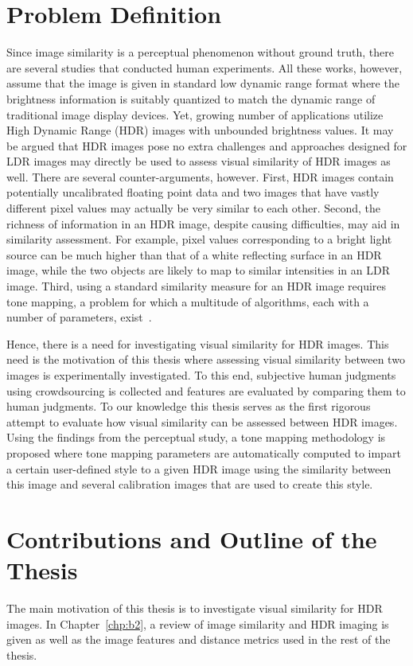 \section{ Problem Definition}
Since image similarity is a perceptual phenomenon without ground truth, there are several studies that conducted human experiments. All these works, however, assume that the image is given in standard low dynamic range format where the brightness information is suitably quantized to match the dynamic range of traditional image display devices. Yet, growing number of applications utilize High Dynamic Range (HDR) images with unbounded brightness values. It may be argued that HDR images pose no extra challenges and approaches designed for LDR images may directly be used to assess visual similarity of HDR images as well. There are several counter-arguments, however. First, HDR images contain potentially uncalibrated floating point data and two images that have vastly different pixel values may actually be very similar to each other. Second, the richness of information in an HDR image, despite causing difficulties, may aid in similarity assessment. For example, pixel values corresponding to a bright light source can be much higher than that of a white reflecting surface in an HDR image, while the two objects are likely to map to similar intensities in an LDR image. Third, using a standard similarity measure for an HDR image requires tone mapping, a problem for which a multitude of algorithms, each with a number of parameters, exist~\cite{yeganeh2012objective}.

Hence, there is a need for investigating visual similarity for HDR images. This need is the motivation of this thesis where assessing visual similarity between two images is experimentally investigated. To this end, subjective human judgments using crowdsourcing is collected and features are evaluated by comparing them to human judgments. To our knowledge this thesis serves as the first rigorous attempt to evaluate how visual similarity can be assessed between HDR images. Using the findings from the perceptual study, a tone mapping methodology is proposed where tone mapping parameters are automatically computed to impart a certain user-defined style to a given HDR image using the similarity between this image and several calibration images that are used to create this style.

\section{Contributions and Outline of the Thesis}
The main motivation of this thesis is to investigate visual similarity for HDR images. In Chapter~\ref{chp:b2}, a review of image similarity and HDR imaging is given as well as the image features and distance metrics used in the rest of the thesis.



